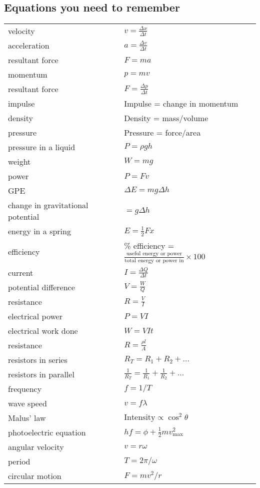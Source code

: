 \documentclass[a4paper,11pt,twoside]{memoir}
\begin{document}
\subsection{Equations you need to remember}

\renewcommand*{\arraystretch}{2}
\begin{longtable}{ll}
velocity & $v= \frac{\Delta x}{\Delta t}$ \\
acceleration & $a= \frac{\Delta v}{\Delta t}$ \\
resultant force & $F=ma$ \\
momentum & $p=mv$ \\
resultant force & $F=\frac{\Delta p}{\Delta t}$ \\
impulse & Impulse = change in momentum \\
density & Density = mass/volume \\
pressure & Pressure = force/area \\
pressure in a liquid & $P = \rho gh$ \\
weight & $W = mg$ \\
power & $P = Fv$ \\
GPE & $\Delta E = mg \Delta h$ \\
change in gravitational potential & $=g \Delta h $ \\
energy in a spring & $E = \frac{1}{2} Fx$ \\
efficiency & \% efficiency =
$\frac{\text{useful energy or power}}{\text{total energy or power in}}
\times 100$ \\
current & $I = \frac{\Delta Q}{\Delta t}$ \\
potential difference & $V = \frac{W}{Q}$ \\
resistance & $R = \frac{V}{I}$ \\
electrical power & $P = VI$ \\
electrical work done & $W = VIt$\\
resistance & $R = \frac{\rho l}{A}$ \\
resistors in series & $R_T = R_1 + R_2 + \ldots{}$\\
resistors in parallel &
\(\frac{1}{R_{T}} = \frac{1}{R_{1}} + \frac{1}{R_{2}} + \ldots\)\\
frequency & $f = 1/T$\\
wave speed & $v = f\lambda$\\
Malus' law & $\text{Intensity} \propto \cos^2{\theta}$\\
photoelectric equation & \(hf = \phi + \frac{1}{2}mv_{\max}^{2}\)\\
angular velocity & $v = r\omega$ \\
period & $T = 2\pi /\omega$\\
circular motion & $F = mv^2/r$\\


\end{longtable}
\end{document}
